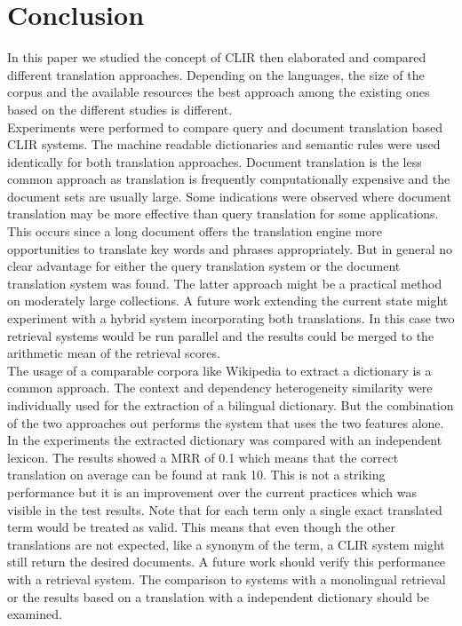 \documentclass[journal]{IEEEtran}
\begin{document}
\section{Conclusion}
In this paper we studied the concept of CLIR then elaborated and compared different translation approaches.
Depending on the languages, the size of the corpus and the available resources the best approach among the existing ones based on the different studies is different.
\mbox{}\\

Experiments were performed to compare query and document translation based CLIR systems.
The machine readable dictionaries and semantic rules were used identically for both translation approaches.
Document translation is the less common approach as translation is frequently computationally expensive and the document sets are usually large.
Some indications were observed where document translation may be more effective than query translation for some applications.
This occurs since a long document offers the translation engine more opportunities to translate key words and phrases appropriately.
But in general no clear advantage for either the query translation system or the document translation system was found.
The latter approach might be a practical method on moderately large collections.
A future work extending the current state might experiment with a hybrid system incorporating both translations.
In this case two retrieval systems would be run parallel and the results could be merged to the arithmetic mean of the retrieval scores.
\mbox{}\\

The usage of a comparable corpora like Wikipedia to extract a dictionary is a common approach.
The context and dependency heterogeneity similarity were individually used for the extraction of a bilingual dictionary.
But the combination of the two approaches out performs the system that uses the two features alone.
In the experiments the extracted dictionary was compared with an independent lexicon.
The results showed a MRR of 0.1 which means that the correct translation on average can be found at rank 10.
This is not a striking performance but it is an improvement over the current practices which was visible in the test results.
Note that for each term only a single exact translated term would be treated as valid.
This means that even though the other translations are not expected, like a synonym of the term, a CLIR system might still return the desired documents.
A future work should verify this performance with a retrieval system.
The comparison to systems with a monolingual retrieval or the results based on a translation with a independent dictionary should be examined.
\mbox{}\\
\end{document}
